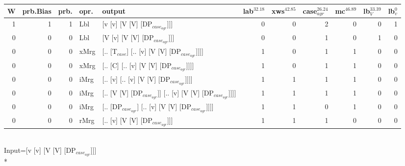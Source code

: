\begin{tabularx}{\linewidth}{rrrlXrrrrrr}
\hline
   W &   prb.Bias &   prb. & opr.   & output                                                    &   lab$^{32.18}$ &   xws$^{42.85}$ &   case$_{agr}^{26.24}$ &   mc$^{46.89}$ &   lb$_{V}^{33.39}$ &   lb$_{v}^{0}$ \\
\hline
   1 &       1 &   1 & Lbl  & [v [v] [V [V] [DP$_{case_{agr}}$]]]                             &             0 &             0 &                  2 &            0 &              0 &             1 \\
   0 &       0 &   0 & Lbl  & [V [v] [V [V] [DP$_{case_{agr}}$]]]                             &             0 &             0 &                  1 &            0 &              1 &             0 \\
   0 &       0 &   0 & xMrg & [.. [T$_{case}$] [.. [v] [V [V] [DP$_{case_{agr}}$]]]]              &             1 &             0 &                  1 &            1 &              0 &             0 \\
   0 &       0 &   0 & xMrg & [.. [C] [.. [v] [V [V] [DP$_{case_{agr}}$]]]]                   &             1 &             0 &                  1 &            1 &              0 &             0 \\
   0 &       0 &   0 & iMrg & [.. [v] [.. [v] [V [V] [DP$_{case_{agr}}$]]]]                   &             1 &             1 &                  1 &            1 &              0 &             0 \\
   0 &       0 &   0 & iMrg & [.. [V [V] [DP$_{case_{agr}}$]] [.. [v] [V [V] [DP$_{case_{agr}}$]]]] &             1 &             1 &                  1 &            1 &              0 &             0 \\
   0 &       0 &   0 & iMrg & [.. [DP$_{case_{agr}}$] [.. [v] [V [V] [DP$_{case_{agr}}$]]]]         &             1 &             1 &                  0 &            1 &              0 &             0 \\
   0 &       0 &   0 & rMrg & [.. [v] [V [V] [DP$_{case_{agr}}$]]]                            &             1 &             1 &                  1 &            0 &              0 &             0 \\
\hline
\end{tabularx}\endgroup\\
\begingroup\scriptsize Input=[v [v] [V [V] [DP$_{case_{agr}}$]]]\\*
